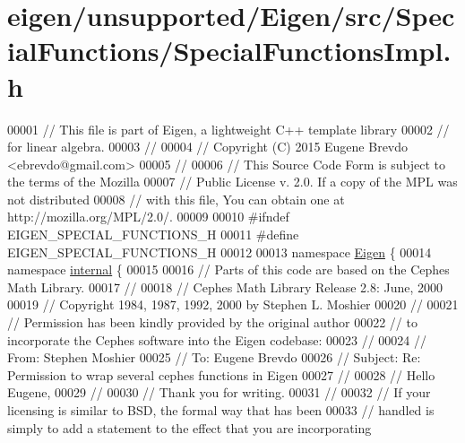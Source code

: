 \hypertarget{eigen_2unsupported_2_eigen_2src_2_special_functions_2_special_functions_impl_8h_source}{}\section{eigen/unsupported/\+Eigen/src/\+Special\+Functions/\+Special\+Functions\+Impl.h}
\label{eigen_2unsupported_2_eigen_2src_2_special_functions_2_special_functions_impl_8h_source}

\begin{DoxyCode}
00001 \textcolor{comment}{// This file is part of Eigen, a lightweight C++ template library}
00002 \textcolor{comment}{// for linear algebra.}
00003 \textcolor{comment}{//}
00004 \textcolor{comment}{// Copyright (C) 2015 Eugene Brevdo <ebrevdo@gmail.com>}
00005 \textcolor{comment}{//}
00006 \textcolor{comment}{// This Source Code Form is subject to the terms of the Mozilla}
00007 \textcolor{comment}{// Public License v. 2.0. If a copy of the MPL was not distributed}
00008 \textcolor{comment}{// with this file, You can obtain one at http://mozilla.org/MPL/2.0/.}
00009 
00010 \textcolor{preprocessor}{#ifndef EIGEN\_SPECIAL\_FUNCTIONS\_H}
00011 \textcolor{preprocessor}{#define EIGEN\_SPECIAL\_FUNCTIONS\_H}
00012 
00013 \textcolor{keyword}{namespace }\hyperlink{namespace_eigen}{Eigen} \{
00014 \textcolor{keyword}{namespace }\hyperlink{namespaceinternal}{internal} \{
00015 
00016 \textcolor{comment}{//  Parts of this code are based on the Cephes Math Library.}
00017 \textcolor{comment}{//}
00018 \textcolor{comment}{//  Cephes Math Library Release 2.8:  June, 2000}
00019 \textcolor{comment}{//  Copyright 1984, 1987, 1992, 2000 by Stephen L. Moshier}
00020 \textcolor{comment}{//}
00021 \textcolor{comment}{//  Permission has been kindly provided by the original author}
00022 \textcolor{comment}{//  to incorporate the Cephes software into the Eigen codebase:}
00023 \textcolor{comment}{//}
00024 \textcolor{comment}{//    From: Stephen Moshier}
00025 \textcolor{comment}{//    To: Eugene Brevdo}
00026 \textcolor{comment}{//    Subject: Re: Permission to wrap several cephes functions in Eigen}
00027 \textcolor{comment}{//}
00028 \textcolor{comment}{//    Hello Eugene,}
00029 \textcolor{comment}{//}
00030 \textcolor{comment}{//    Thank you for writing.}
00031 \textcolor{comment}{//}
00032 \textcolor{comment}{//    If your licensing is similar to BSD, the formal way that has been}
00033 \textcolor{comment}{//    handled is simply to add a statement to the effect that you are incorporating}

\end{DoxyCode}
